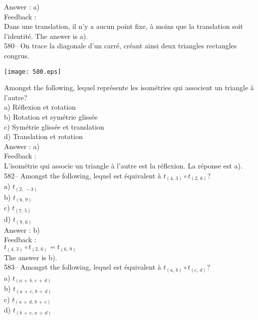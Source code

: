 ﻿\documentclass[letterpaper, 12pt]{article}
\begin{document}
Answer : a)\\

Feedback : \\
Dans une translation, il n'y a aucun point fixe, \`a moins que la
translation soit l'identit\'e.  The answer is a).\\

580-- On trace la diagonale d'un carr\'e, cr\'eant ainsi deux
triangles rectangles congrus.\\
\begin{center}
    \texttt{[image: 580.eps]}
    \end{center}
Amongst the following, lequel repr\'esente
les isom\'etries qui associent un triangle \`a l'autre?\\
a) R\'eflexion et rotation\\
b) Rotation et sym\'etrie gliss\'ee\\
c) Sym\'etrie gliss\'ee et translation\\
d) Translation et rotation\\

Answer : a) \\

Feedback : \\
L'isom\'etrie qui associe un triangle \`a l'autre est la r\'eflexion.  La
r\'eponse est a).\\


582-- Amongst the following, lequel est \'equivalent \`a
$t_{\left(4,\,3\right)} \circ t_{\left(2,\,6\right) }$?\\
a) $t_{\left(2,\,-3\right) }$\\
b) $t_{\left(6,\,9\right) }$\\
c) $t_{\left(7,\,5\right) }$\\
d) $t_{\left(9,\,6\right) }$\\

Answer : b)\\

Feedback : \\
$t_{\left(4,\,3\right)} \circ t_{\left(2,\,6\right) }= t_{\left(6,\,9\right)
}$\\
The answer is b).\\

583-- Amongst the following, lequel est \'equivalent \`a
$t_{\left(a,\,b\right)} \circ t_{\left(c,\,d\right) }$?\\
a) $t_{\left(a\,+\,b,\,c\,+\,d\right) }$\\
b) $t_{\left(a\,+\,c,\,b\,+\,d\right) }$\\
c) $t_{\left(a\,+\,d,\,b\,+\,c\right) }$\\
d) $t_{\left(b\,+\,c,\,a\,+\,d\right) }$\\
\end{document}
